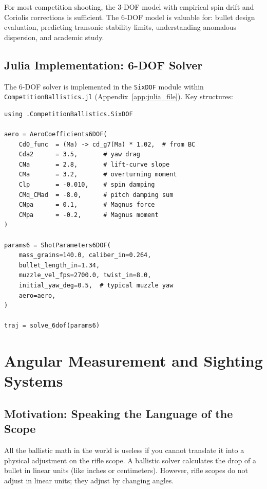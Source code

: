\documentclass[11pt,twoside,openright]{report}
\begin{document}
For most competition shooting, the 3-DOF model with empirical spin drift and Coriolis corrections is sufficient. The 6-DOF model is valuable for: bullet design evaluation, predicting transonic stability limits, understanding anomalous dispersion, and academic study.

\section{Julia Implementation: 6-DOF Solver}

The 6-DOF solver is implemented in the \texttt{SixDOF} module within \texttt{CompetitionBallistics.jl} (Appendix~\ref{app:julia_file}). Key structures:

\begin{lstlisting}[caption={6-DOF solver usage example},label={lst:6dof_example}]
using .CompetitionBallistics.SixDOF

aero = AeroCoefficients6DOF(
    Cd0_func  = (Ma) -> cd_g7(Ma) * 1.02,  # from BC
    Cda2      = 3.5,       # yaw drag
    CNa       = 2.8,       # lift-curve slope
    CMa       = 3.2,       # overturning moment
    Clp       = -0.010,    # spin damping
    CMq_CMad  = -8.0,      # pitch damping sum
    CNpa      = 0.1,       # Magnus force
    CMpa      = -0.2,      # Magnus moment
)

params6 = ShotParameters6DOF(
    mass_grains=140.0, caliber_in=0.264,
    bullet_length_in=1.34,
    muzzle_vel_fps=2700.0, twist_in=8.0,
    initial_yaw_deg=0.5,  # typical muzzle yaw
    aero=aero,
)

traj = solve_6dof(params6)
\end{lstlisting}


\chapter{Angular Measurement and Sighting Systems}
\label{ch:sighting}

\section{Motivation: Speaking the Language of the Scope}

All the ballistic math in the world is useless if you cannot translate it into a physical adjustment on the rifle scope. A ballistic solver calculates the drop of a bullet in linear units (like inches or centimeters). However, rifle scopes do not adjust in linear units; they adjust by changing angles. 
\end{document}
